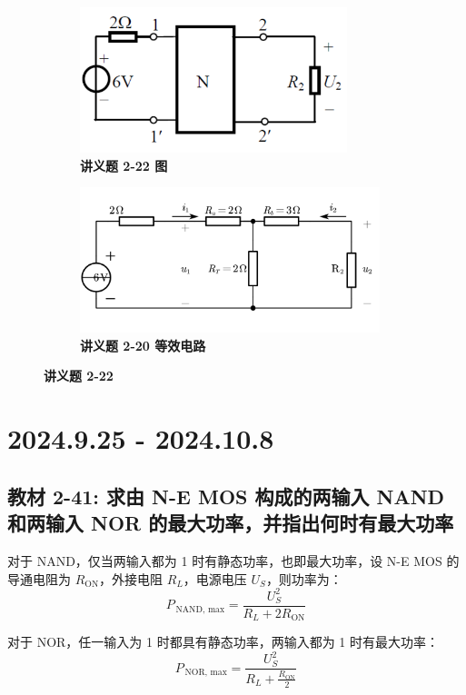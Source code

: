 \documentclass[UTF8]{report}
\theoremstyle{MyLineTheoremStyle} %
\theoremstyle{MyBlockTheoremStyle} %
\theoremstyle{MySubsubsectionStyle} %
\begin{document}
\begin{figure}[H]\centering
\begin{subfigure}[t]{0.5\columnwidth}\centering
    \includegraphics[height=120pt]{assets/4/199279d29390a5449f7ef5c5dc7f8a3d.png}
    \caption{\bfseries 讲义题 2-22 图 }
\end{subfigure}\begin{subfigure}[t]{0.5\columnwidth}\centering
    \includegraphics[height=120pt]{assets/4/bd23c61fd9d5ec13d9ce56376fe64d2c.png}
    \caption{\bfseries 讲义题 2-20 等效电路 }
\end{subfigure}
\caption{\bfseries 讲义题 2-22 }
\end{figure}

\chapter{2024.9.25 - 2024.10.8}\thispagestyle{fancy}

\section{教材 2-41: 求由 N-E MOS 构成的两输入 NAND 和两输入 NOR 的最大功率，并指出何时有最大功率}

对于 NAND，仅当两输入都为 1 时有静态功率，也即最大功率，设 N-E MOS 的导通电阻为 $R_{\text{ON}}$，外接电阻 $R_L$，电源电压 $U_S$，则功率为：
\begin{equation}
    P_{\,\text{NAND, max}} = \frac{U_S^2}{R_L + 2R_{\text{ON}}}
\end{equation}

对于 NOR，任一输入为 1 时都具有静态功率，两输入都为 1 时有最大功率：
\begin{equation}
    P_{\,\text{NOR, max}} = \frac{U_S^2}{R_L + \frac{R_{\text{ON}}}{2}}
\end{equation}
\end{document}
